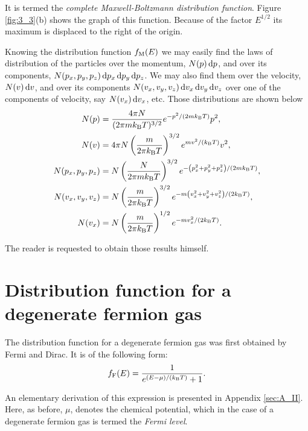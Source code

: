 \noindent
It is termed the \textit{complete Maxwell-Boltzmann distribution function}. Figure \ref{fig:3_3}(b) shows the graph of this function. Because of the factor $E^{1/2}$ its maximum is displaced to the right of the origin.

Knowing the distribution function $f_{\text{M}}(E)$ we may easily find the laws of distribution of the particles over the momentum, $N(p)\,\mathrm{d} p$, and over its components, $N(p_x,p_y,p_z)\,\mathrm{d} p_x\,\mathrm{d} p_y\,\mathrm{d} p_z$. We may also find them over the velocity, $N(v)\,\mathrm{d} v$, and over its components $N(v_x,v_y,v_z)\,\mathrm{d} v_x\,\mathrm{d} v_y\,\mathrm{d} v_z$ over one of the components of velocity, say $N(v_x)\,\mathrm{d} v_x$, etc. Those distributions are shown below
\begin{align}
    N(p) &= \frac{4\pi N}{(2\pi m k_{\text{B}} T)^{3/2}} e^{-p^2/(2mk_{\text{B}}T)} p^2, \label{eq:3_29}\\
    N(v) &= 4\pi N \left(\frac{m}{2\pi k_{\text{B}} T}\right)^{3/2} e^{mv^2/(k_{\text{B}} T)} v^2, \label{eq:3_30}\\
    N(p_x,p_y,p_z) &= N \left(\frac{N}{2\pi mk_{\text{B}} T}\right)^{3/2} e^{-\left(p_x^2+p_y^2+p_z^2\right)/(2mk_{\text{B}} T)}, \label{eq:3_31}\\
    N(v_x,v_y,v_z) &= N \left(\frac{m}{2\pi k_{\text{B}} T}\right)^{3/2} e^{-m\left(v_x^2+v_y^2+v_z^2\right)/(2k_{\text{B}} T)}, \label{eq:3_32}\\
    N(v_x) &= N \left(\frac{m}{2\pi k_{\text{B}} T}\right)^{1/2} e^{-mv_x^2/(2k_{\text{B}} T)}. \label{eq:3_33}
\end{align}

\noindent
The reader is requested to obtain those results himself.

\section{Distribution function for a degenerate fermion gas}\label{sec:27}

The distribution function for a degenerate fermion gas was first obtained by Fermi and Dirac. It is of the following form:
\begin{equation}\label{eq:3_34}
    f_{\text{F}}(E) = \frac{1}{e^{(E - \mu)/(k_{\text{B}} T)} + 1}.
\end{equation}

An elementary derivation of this expression is presented in Appendix \ref{sec:A_II}. Here, as before, $\mu$, denotes the chemical potential, which in the case of a degenerate fermion gas is termed the \textit{Fermi level}.

